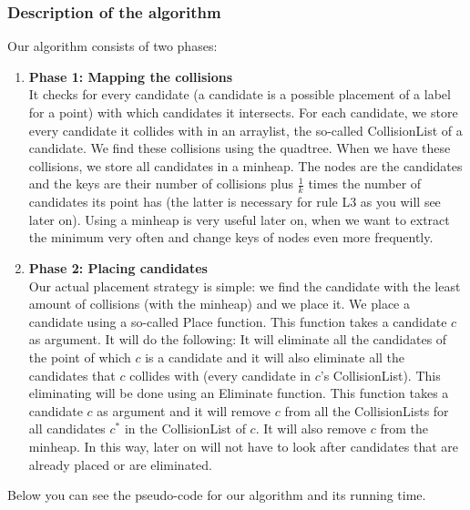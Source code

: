 \documentclass[crop=false,a4paper,oneside,11pt]{article}
\begin{document}
\subsubsection{Description of the algorithm}
Our algorithm consists of two phases:
\begin{enumerate}
\item \textbf{Phase 1: Mapping the collisions}\\
It checks for every candidate (a candidate is a possible placement of a label for a point) with which candidates it intersects. For each candidate, we store every candidate it collides with in an arraylist, the so-called CollisionList of a candidate. We find these collisions using the quadtree. When we have these collisions, we store all candidates in a minheap. The nodes are the candidates and the keys are their number of collisions plus $\frac{1}{k}$ times the number of candidates its point has (the latter is necessary for rule L3 as you will see later on). Using a minheap is very useful later on, when we want to extract the minimum very often and change keys of nodes even more frequently.
\item \textbf{Phase 2: Placing candidates}\\
Our actual placement strategy is simple: we find the candidate with the least amount of collisions (with the minheap) and we place it. We place a candidate using a so-called Place function. This function takes a candidate $c$ as argument. It will do the following: It will eliminate all the candidates of the point of which $c$ is a candidate and it will also eliminate all the candidates that $c$ collides with (every candidate in $c$'s CollisionList). This eliminating will be done using an Eliminate function. This function takes a candidate $c$ as argument and it will remove $c$ from all the CollisionLists for all candidates $c^*$ in the CollisionList of $c$. It will also remove $c$ from the minheap. In this way, later on will not have to look after candidates that are already placed or are eliminated. 
\end{enumerate}
Below you can see the pseudo-code for our algorithm and its running time.
\end{document}
